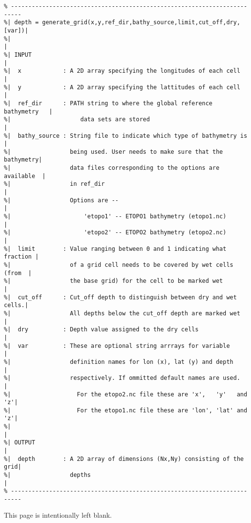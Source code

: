 \documentclass[12pt]{article}
\newcommand{\pb}{\strut \vfill \pagebreak}
\newcommand{\bpagea}{\strut

\vspace{2.5in} \centerline{This page is intentionally left blank.}}
\begin{document}
\begin{verbatim}
% -------------------------------------------------------------------------
%| depth = generate_grid(x,y,ref_dir,bathy_source,limit,cut_off,dry,[var])|
%|                                                                        |
%| INPUT                                                                  |
%|  x            : A 2D array specifying the longitudes of each cell      | 
%|  y            : A 2D array specifying the lattitudes of each cell      |
%|  ref_dir      : PATH string to where the global reference bathymetry   |
%|                    data sets are stored                                |
%|  bathy_source : String file to indicate which type of bathymetry is    |
%|                 being used. User needs to make sure that the bathymetry|
%|                 data files corresponding to the options are available  |
%|                 in ref_dir                                             |
%|                 Options are --                                         |
%|                     'etopo1' -- ETOPO1 bathymetry (etopo1.nc)          |
%|                     'etopo2' -- ETOPO2 bathymetry (etopo2.nc)          |
%|  limit        : Value ranging between 0 and 1 indicating what fraction |
%|                 of a grid cell needs to be covered by wet cells (from  |
%|                 the base grid) for the cell to be marked wet           | 
%|  cut_off      : Cut_off depth to distinguish between dry and wet cells.|
%|                 All depths below the cut_off depth are marked wet      | 
%|  dry          : Depth value assigned to the dry cells                  |
%|  var          : These are optional string arrrays for variable         |
%|                 definition names for lon (x), lat (y) and depth        |
%|                 respectively. If ommitted default names are used.      | 
%|                   For the etopo2.nc file these are 'x',   'y'   and 'z'|
%|                   For the etopo1.nc file these are 'lon', 'lat' and 'z'|
%|                                                                        |
%| OUTPUT                                                                 |
%|  depth        : A 2D array of dimensions (Nx,Ny) consisting of the grid|
%|                 depths                                                 |
% -------------------------------------------------------------------------
\end{verbatim} 

\bpagea
\pb
\end{document}
